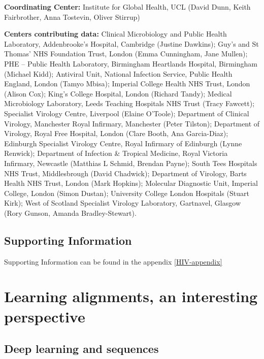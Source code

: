 \documentclass[
  11pt,
  twoside,
  BCOR=10mm,
  listof=totoc]{scrbook}
\begin{document}
\textbf{Coordinating Center:}
Institute for Global Health, UCL (David Dunn, Keith Fairbrother,
Anna Tostevin, Oliver Stirrup)

\textbf{Centers contributing data:}
Clinical Microbiology and Public Health Laboratory, Addenbrooke's
Hospital, Cambridge (Justine Dawkins); Guy's and St Thomas' NHS
Foundation Trust, London (Emma Cunningham, Jane Mullen); PHE --
Public Health Laboratory, Birmingham Heartlands Hospital, Birmingham
(Michael Kidd); Antiviral Unit, National Infection Service, Public
Health England, London (Tamyo Mbisa); Imperial College Health NHS
Trust, London (Alison Cox); King's College Hospital, London (Richard
Tandy); Medical Microbiology Laboratory, Leeds Teaching Hospitals
NHS Trust (Tracy Fawcett); Specialist Virology Centre, Liverpool
(Elaine O'Toole); Department of Clinical Virology, Manchester Royal
Infirmary, Manchester (Peter Tilston); Department of Virology, Royal
Free Hospital, London (Clare Booth, Ana Garcia-Diaz); Edinburgh
Specialist Virology Centre, Royal Infirmary of Edinburgh (Lynne
Renwick); Department of Infection \& Tropical Medicine, Royal
Victoria Infirmary, Newcastle (Matthias L Schmid, Brendan Payne);
South Tees Hospitals NHS Trust, Middlesbrough (David Chadwick);
Department of Virology, Barts Health NHS Trust, London (Mark
Hopkins); Molecular Diagnostic Unit, Imperial College, London (Simon
Dustan); University College London Hospitals (Stuart Kirk); West of
Scotland Specialist Virology Laboratory, Gartnavel, Glasgow (Rory
Gunson, Amanda Bradley-Stewart).

\hypertarget{supporting-information}{%
\section*{Supporting Information}\label{supporting-information}}

Supporting Information can be found in the appendix \ref{HIV-appendix}

\printbibliography[segment=\therefsegment,heading=subbibintoc,title={References for chapter \thechapter}]

\hypertarget{learning-alignments-an-interesting-perspective}{%
\chapter{Learning alignments, an interesting perspective}\label{learning-alignments-an-interesting-perspective}}

\hypertarget{deep-learning-and-sequences}{%
\section{Deep learning and sequences}\label{deep-learning-and-sequences}}
\end{document}
